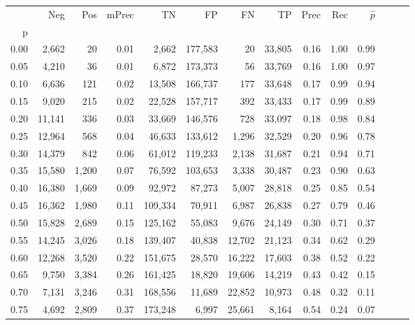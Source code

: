 \begin{tabular}{rrrrrrrrrrrrrr}
\toprule
{} &     Neg &    Pos & mPrec &       TN &       FP &      FN &      TP &  Prec &   Rec & $\hat{p}$ \\
p    &         &        &       &          &          &         &         &       &       &           \\
\midrule
0.00 &   2,662 &     20 &  0.01 &    2,662 &  177,583 &      20 &  33,805 &  0.16 &  1.00 &      0.99 \\
0.05 &   4,210 &     36 &  0.01 &    6,872 &  173,373 &      56 &  33,769 &  0.16 &  1.00 &      0.97 \\
0.10 &   6,636 &    121 &  0.02 &   13,508 &  166,737 &     177 &  33,648 &  0.17 &  0.99 &      0.94 \\
0.15 &   9,020 &    215 &  0.02 &   22,528 &  157,717 &     392 &  33,433 &  0.17 &  0.99 &      0.89 \\
0.20 &  11,141 &    336 &  0.03 &   33,669 &  146,576 &     728 &  33,097 &  0.18 &  0.98 &      0.84 \\
0.25 &  12,964 &    568 &  0.04 &   46,633 &  133,612 &   1,296 &  32,529 &  0.20 &  0.96 &      0.78 \\
0.30 &  14,379 &    842 &  0.06 &   61,012 &  119,233 &   2,138 &  31,687 &  0.21 &  0.94 &      0.71 \\
0.35 &  15,580 &  1,200 &  0.07 &   76,592 &  103,653 &   3,338 &  30,487 &  0.23 &  0.90 &      0.63 \\
0.40 &  16,380 &  1,669 &  0.09 &   92,972 &   87,273 &   5,007 &  28,818 &  0.25 &  0.85 &      0.54 \\
0.45 &  16,362 &  1,980 &  0.11 &  109,334 &   70,911 &   6,987 &  26,838 &  0.27 &  0.79 &      0.46 \\
0.50 &  15,828 &  2,689 &  0.15 &  125,162 &   55,083 &   9,676 &  24,149 &  0.30 &  0.71 &      0.37 \\
0.55 &  14,245 &  3,026 &  0.18 &  139,407 &   40,838 &  12,702 &  21,123 &  0.34 &  0.62 &      0.29 \\
0.60 &  12,268 &  3,520 &  0.22 &  151,675 &   28,570 &  16,222 &  17,603 &  0.38 &  0.52 &      0.22 \\
0.65 &   9,750 &  3,384 &  0.26 &  161,425 &   18,820 &  19,606 &  14,219 &  0.43 &  0.42 &      0.15 \\
0.70 &   7,131 &  3,246 &  0.31 &  168,556 &   11,689 &  22,852 &  10,973 &  0.48 &  0.32 &      0.11 \\
0.75 &   4,692 &  2,809 &  0.37 &  173,248 &    6,997 &  25,661 &   8,164 &  0.54 &  0.24 &      0.07 \\

\end{tabular}
